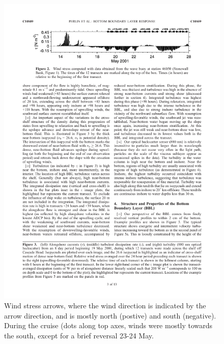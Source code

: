 \begin{figure}[hbt]
  \begin{center}
  \includegraphics{figs/WindOverview/PerlinFig2}
    \caption{Wind stress arrows, where the wind direction is indicated by the arrow direction, and is mostly north (postive) and south (negative).  During the cruise (dots along top axes, winds were mostly towards the south, except for a brief reversal 23-24 May.  }
    \label{fig:PerlinFig2}  
  \end{center}
\end{figure}

